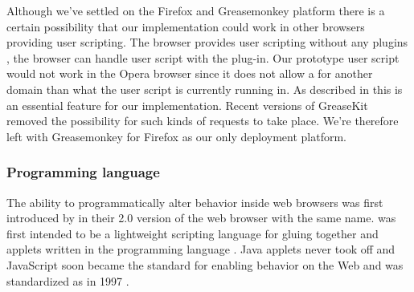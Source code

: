 Although we've settled on the Firefox and Greasemonkey platform there is a
certain possibility that our implementation could work in other browsers
providing user scripting. The  browser provides user scripting
without any plugins%
,
the  browser can handle user script with the
%
plug-in. Our prototype user script would not work in the Opera browser since
it does not allow a  for another domain than what the
user script is currently running in. As described in
this is an essential feature for our implementation. Recent versions of
GreaseKit removed the possibility for such kinds of requests to take place.
We're therefore left with Greasemonkey for Firefox as our only deployment
platform.

\subsubsection{Programming language}
\label{section:selection.stack.client.language}

The ability to programmatically alter behavior inside web browsers was first
introduced by  in their 2.0 version of the web browser
with the same name.  was first intended to be a
lightweight scripting language for gluing together  and applets
written in the  programming language \citep{netscape95}.%
Java applets never took off and JavaScript soon became the 
standard for enabling behavior on the Web and was standardized as
 in 1997 \citep{ecma99}.

